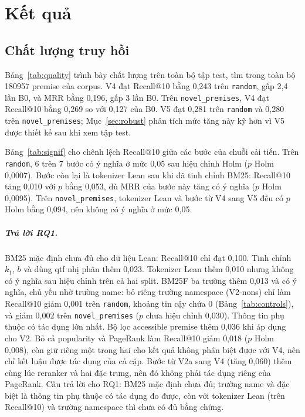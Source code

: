 \documentclass[11pt,a4paper,oneside]{report}
\newcommand{\code}[1]{\texttt{#1}}
\begin{document}
\chapter{Kết quả}\label{sec:results}

\section{Chất lượng truy hồi}

Bảng~\ref{tab:quality} trình bày chất lượng trên toàn bộ tập test, tìm trong toàn bộ \num{180957} premise của corpus. V4 đạt
Recall@10 bằng 0,243 trên \code{random}, gấp 2,4 lần B0, và MRR bằng 0,196, gấp 3 lần B0. Trên \code{novel\_premises},
V4 đạt Recall@10 bằng 0,269 so với 0,127 của B0. V5 đạt 0,281 trên \code{random} và 0,280 trên \code{novel\_premises};
Mục~\ref{sec:robust} phân tích mức tăng này kỹ hơn vì V5 được thiết kế sau khi xem tập test.



Bảng~\ref{tab:signif} cho chênh lệch Recall@10 giữa các bước của chuỗi cải tiến. Trên \code{random}, 6 trên 7 bước có ý
nghĩa ở mức 0,05 sau hiệu chỉnh Holm ($p$ Holm 0,0007). Bước còn lại là tokenizer Lean sau khi đã tinh chỉnh BM25: Recall@10 tăng
0,010 với $p$ bằng 0,053, dù MRR của bước này tăng có ý nghĩa ($p$ Holm 0,0095). Trên \code{novel\_premises}, tokenizer Lean
và bước từ V4 sang V5 đều có $p$ Holm bằng 0,094, nên không có ý nghĩa ở mức 0,05.



\paragraph{Trả lời RQ1.} BM25 mặc định chưa đủ cho dữ liệu Lean: Recall@10 chỉ đạt 0,100. Tinh chỉnh $k_1$, $b$ và dùng qtf
nhị phân thêm 0,023. Tokenizer Lean thêm 0,010 nhưng không có ý nghĩa sau hiệu chỉnh trên cả hai split. BM25F ba trường
thêm 0,013 và có ý nghĩa, chủ yếu nhờ trường name: bỏ riêng trường namespace (V2-nons) chỉ làm Recall@10 giảm 0,001 trên
\code{random}, khoảng tin cậy chứa 0 (Bảng~\ref{tab:controls}), và giảm 0,002 trên \code{novel\_premises} ($p$ chưa hiệu
chỉnh 0,030). Thông tin phụ thuộc có tác dụng lớn nhất. Bộ lọc accessible premise thêm 0,036 khi áp dụng cho V2. Bỏ cả
popularity và PageRank làm Recall@10 giảm 0,018 ($p$ Holm 0,008), còn giữ riêng một trong hai cho kết quả không phân biệt
được với V4, nên chỉ kết luận được tác dụng của cả cặp. Bước từ V2a sang V4 (tăng 0,060) thêm cùng lúc reranker và hai đặc
trưng, nên đó không phải tác dụng riêng của PageRank. Câu trả lời cho RQ1: BM25 mặc định chưa đủ; trường name và đặc biệt
là thông tin phụ thuộc có tác dụng đo được, còn với tokenizer Lean (trên Recall@10) và trường namespace thì chưa có đủ bằng
chứng.
\end{document}
